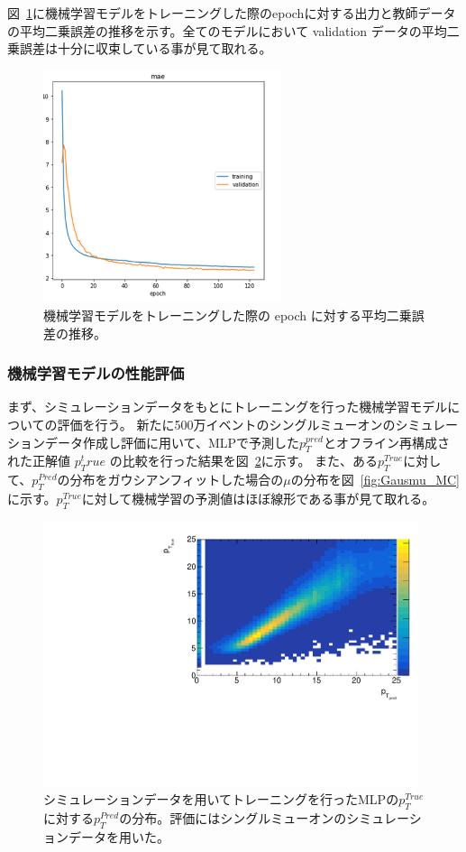 図~\ref{fig:epoch}に機械学習モデルをトレーニングした際のepochに対する出力と教師データの平均二乗誤差の推移を示す。全てのモデルにおいて validation データの平均二乗誤差は十分に収束している事が見て取れる。

\begin{figure}[tb]
  \centering
  \includegraphics[clip, width=7cm]{fig/4/epoch2.png}
  \caption{機械学習モデルをトレーニングした際の epoch に対する平均二乗誤差の推移。}
  \label{fig:epoch}
\end{figure}


\newpage
\subsubsection{機械学習モデルの性能評価}
まず、シミュレーションデータをもとにトレーニングを行った機械学習モデルについての評価を行う。
新たに500万イベントのシングルミューオンのシミュレーションデータ作成し評価に用いて、MLPで予測した$p_{T}^{pred}$とオフライン再構成された正解値 $p_{T}^true$ の比較を行った結果を図~\ref{fig:zannsa_25_MC}に示す。
また、ある$p_T^{True}$に対して、$p_T^{Pred}$の分布をガウシアンフィットした場合の$\mu$の分布を図~\ref{fig:Gausmu_MC}に示す。$p_T^{True}$に対して機械学習の予測値はほぼ線形である事が見て取れる。

\begin{figure}[tb]
  \centering
  \includegraphics[clip, width=11cm]{fig/4/zansa_25_MC.pdf}
  \caption{シミュレーションデータを用いてトレーニングを行ったMLPの$p_{T}^{True}$に対する$p_{T}^{Pred}$の分布。評価にはシングルミューオンのシミュレーションデータを用いた。}
  \label{fig:zannsa_25_MC}
\end{figure}

